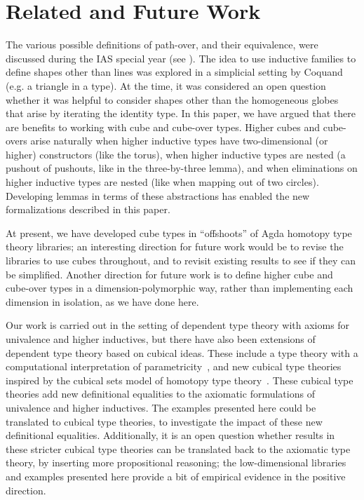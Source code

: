 \section{Related and Future Work}

The various possible definitions of path-over, and their equivalence,
were discussed during the IAS special year (see \citep[Remark
  6.3.2]{uf13hott-book}).  The idea to use inductive families to define
shapes other than lines was explored in a simplicial setting by Coquand
(e.g. a triangle in a type).  At the time, it was considered an open
question whether it was helpful to consider shapes other than the
homogeneous globes that arise by iterating the identity type.  In this
paper, we have argued that there are benefits to working with cube and
cube-over types.  Higher cubes and cube-overs arise naturally when
higher inductive types have two-dimensional (or higher) constructors
(like the torus), when higher inductive types are nested (a pushout of
pushouts, like in the three-by-three lemma), and when eliminations on
higher inductive types are nested (like when mapping out of two
circles).  Developing lemmas in terms of these abstractions has enabled
the new formalizations described in this paper.

At present, we have developed cube types in ``offshoots'' of Agda
homotopy type theory libraries; an interesting direction for future work
would be to revise the libraries to use cubes throughout, and to revisit
existing results to see if they can be simplified.  Another direction
for future work is to define higher cube and cube-over types in a
dimension-polymorphic way, rather than implementing each dimension in
isolation, as we have done here.

Our work is carried out in the setting of dependent type theory with
axioms for univalence and higher inductives, but there have also been
extensions of dependent type theory based on cubical ideas.  These
include a type theory with a computational interpretation of
parametricity~\citep{bernardy12parametricity}, and new cubical type
theories~\citep{coquand14variations,altenkirchkaposi14cubical,lb14cubes-oxford}
inspired by the cubical sets model of homotopy type
theory~\citep{coquand+13cubical}.  These cubical type theories add new
definitional equalities to the axiomatic formulations of univalence and
higher inductives.  The examples presented here could be translated to
cubical type theories, to investigate the impact of these new
definitional equalities.  Additionally, it is an open question whether
results in these stricter cubical type theories can be translated back
to the axiomatic type theory, by inserting more propositional reasoning;
the low-dimensional libraries and examples presented here provide a bit
of empirical evidence in the positive direction.
